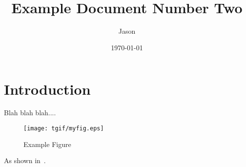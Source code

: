 \documentclass[11pt]{article}
\title{Example Document Number Two}
\author{Jason}
\date{\today}
\begin{document}
\maketitle
\section{Introduction}
Blah blah blah....

\begin{figure}[ht]
\centering
\texttt{[image: tgif/myfig.eps]}
\caption{Example Figure}
\label{fig:myfig}
\end{figure}

As shown in~\cite{en300.175-2v1.4.2}.


\end{document}
